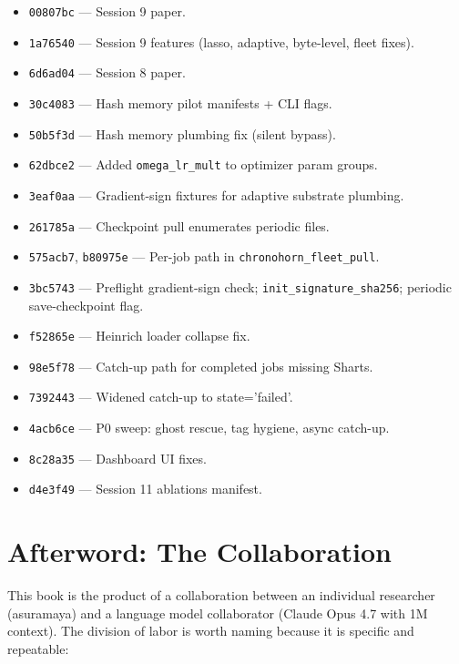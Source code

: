 \documentclass[11pt,openany]{book}
\theoremstyle{definition}
\theoremstyle{plain}
\begin{document}
\begin{itemize}
  \item \texttt{00807bc} --- Session 9 paper.
  \item \texttt{1a76540} --- Session 9 features (lasso, adaptive,
    byte-level, fleet fixes).
  \item \texttt{6d6ad04} --- Session 8 paper.
  \item \texttt{30c4083} --- Hash memory pilot manifests + CLI flags.
  \item \texttt{50b5f3d} --- Hash memory plumbing fix (silent bypass).
  \item \texttt{62dbce2} --- Added \texttt{omega\_lr\_mult} to
    optimizer param groups.
  \item \texttt{3eaf0aa} --- Gradient-sign fixtures for adaptive
    substrate plumbing.
  \item \texttt{261785a} --- Checkpoint pull enumerates periodic
    files.
  \item \texttt{575acb7}, \texttt{b80975e} --- Per-job path in
    \texttt{chronohorn\_fleet\_pull}.
  \item \texttt{3bc5743} --- Preflight gradient-sign check;
    \texttt{init\_signature\_sha256}; periodic save-checkpoint flag.
  \item \texttt{f52865e} --- Heinrich loader collapse fix.
  \item \texttt{98e5f78} --- Catch-up path for completed jobs
    missing Sharts.
  \item \texttt{7392443} --- Widened catch-up to state='failed'.
  \item \texttt{4acb6ce} --- P0 sweep: ghost rescue, tag hygiene,
    async catch-up.
  \item \texttt{8c28a35} --- Dashboard UI fixes.
  \item \texttt{d4e3f49} --- Session 11 ablations manifest.
\end{itemize}

\backmatter

\chapter*{Afterword: The Collaboration}

This book is the product of a collaboration between an individual
researcher (asuramaya) and a language model collaborator (Claude Opus
4.7 with 1M context). The division of labor is worth naming because it
is specific and repeatable:
\end{document}
